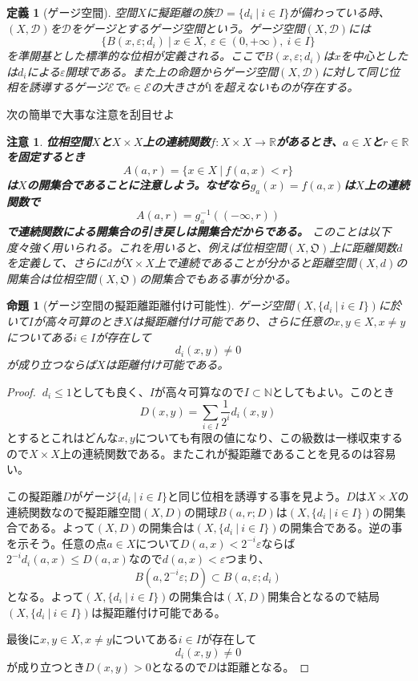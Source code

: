 \documentclass[leqno]{jsarticle}
\newtheorem{prop}[thm]{命題}
\newtheorem{df}[thm]{定義}
\newtheorem*{cau}{注意}
\newcommand{\nn}{\mathbb{N}}
\newcommand{\rr}{\mathbb{R}}
\newcommand{\mgn}{\infty}
\newcommand{\ep}{\varepsilon}
\begin{document}
\begin{df}[ゲージ空間]
空間$X$に擬距離の族$\mathcal{D}=\{d_{i}\ |\ i\in I\}$が備わっている時、$(X,\mathcal{D})$を$\mathcal{D}$をゲージとするゲージ空間という。ゲージ空間$(X,\mathcal{D})$には
\[
\{B(x,\ep;d_i)\ |\ x\in X,\ \ep\in (0,+\mgn), \ i\in I\}
\]
を準開基とした標準的な位相が定義される。ここで$B(x,\ep;d_i)$は$x$を中心としたは$d_i$による$\ep$開球である。また上の命題からゲージ空間$(X,\mathcal{D})$に対して同じ位相を誘導するゲージ$\mathcal{E}$で$e\in \mathcal{E}$の大きさが$1$を超えないものが存在する。
\end{df}
次の簡単で大事な注意を刮目せよ
\begin{cau}{\bf
位相空間$X$と$X\times X$上の連続関数$f:X\times X\to \rr$があるとき、$a\in X$と$r\in \rr$を固定するとき
\[
A(a,r)=\{x\in X\ |\ f(a,x)<r\}
\]
は$X$の開集合であることに注意しよう。なぜなら$g_{a}(x)=f(a,x)$は$X$上の連続関数で
\[
A(a,r)=g_a^{-1}((-\mgn,r))
\]
で連続関数による開集合の引き戻しは開集合だからである。}
このことは以下度々強く用いられる。これを用いると、例えば位相空間$(X,\mathfrak{O})$上に距離関数$d$を定義して、さらに$d$が$X\times X$上で連続であることが分かると距離空間$(X,d)$の開集合は位相空間$(X,\mathfrak{O})$の開集合でもある事が分かる。
\end{cau}
\begin{prop}[ゲージ空間の擬距離距離付け可能性]\label{metric}
ゲージ空間$(X,\{d_{i}\ |\ i\in I\})$に於いて$I$が高々可算のとき$X$は擬距離付け可能であり、さらに任意の$x,y\in X,x\neq y$についてある$i\in I$が存在して
\[
d_i(x,y)\neq0
\]
が成り立つならば$X$は距離付け可能である。
\end{prop}
\begin{proof}
$\ d_i\le 1$としても良く、$I$が高々可算なので$I\subset \nn$としてもよい。このとき
\[
D(x,y)=\sum_{i\in I}\frac{1}{2^{i}}d_i(x,y)
\]
とするとこれはどんな$x,y$についても有限の値になり、この級数は一様収束するので$X\times X$上の連続関数である。またこれが擬距離であることを見るのは容易い。\par
この擬距離$D$がゲージ$\{d_{i}\ |\ i\in I\}$と同じ位相を誘導する事を見よう。$D$は$X\times X$の連続関数なので擬距離空間$(X,D)$の開球$B(a,r;D)$は$(X,\{d_{i}\ |\ i\in I\})$の開集合である。よって$(X,D)$の開集合は$(X,\{d_{i}\ |\ i\in I\})$の開集合である。逆の事を示そう。任意の点$a\in X$について$D(a,x)<2^{-i}\ep$ならば$2^{-i}d_i(a,x)\le D(a,x)$なので$d(a,x)<\ep$つまり、
\[
B(a,2^{-i}\ep;D)\subset B(a,\ep;d_i)
\]
となる。よって$(X,\{d_{i}\ |\ i\in I\})$の開集合は$(X,D)$開集合となるので結局$(X,\{d_{i}\ |\ i\in I\})$は擬距離付け可能である。\par
最後に$x,y\in X,x\neq y$についてある$i\in I$が存在して
\[
d_i(x,y)\neq0
\]
が成り立つとき$D(x,y)>0$となるので$D$は距離となる。
\end{proof}
\setcounter{equation}{0}
\end{document}
